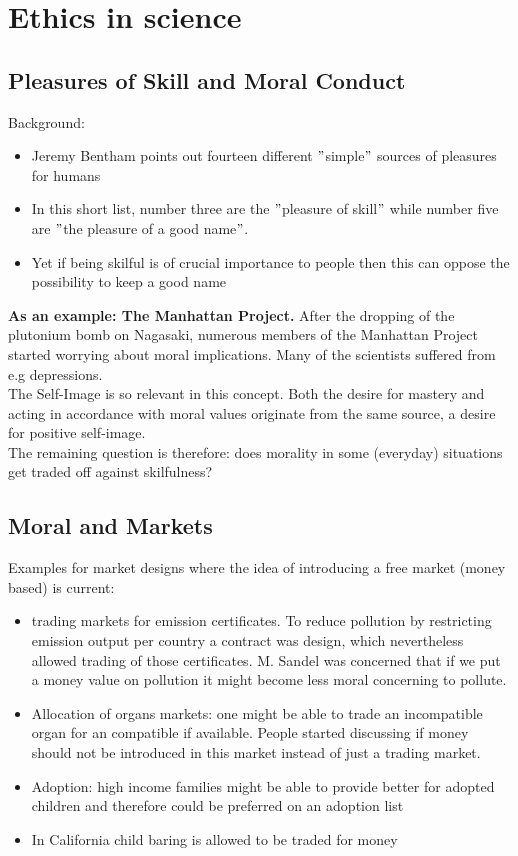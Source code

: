 

\chapter{Ethics in science}

\section{Pleasures of Skill and Moral Conduct}

Background:
\begin{itemize}
	\item Jeremy Bentham points out fourteen different $"$simple$"$ sources of pleasures for humans
	\item In this short list, number three are the $"$pleasure of skill$"$ while number five are $"$the pleasure of a good name$"$.
	\item Yet if being skilful is of crucial importance to people then this can oppose the possibility to keep a good name
\end{itemize}
  
  
  
\textbf{As an example: The Manhattan Project.} After the dropping of the plutonium bomb on Nagasaki, numerous members of the Manhattan Project started worrying about moral implications. Many of the scientists suffered from e.g depressions. \\ 

The Self-Image is so relevant in this concept. Both the desire for mastery and acting in accordance with moral values originate from the same source, a desire for positive self-image. \\ 

The remaining question is therefore: does morality in some (everyday) situations get traded off against skilfulness?


\section{Moral and Markets}

Examples for market designs where the idea of introducing a free market (money based) is current:
\begin{itemize}
	\item trading markets for emission certificates. To reduce pollution by restricting emission output per country a contract was design, which nevertheless allowed trading of those certificates. M. Sandel was concerned that if we put a money value on pollution it might become less moral concerning to pollute.
	\item Allocation of organs markets: one might be able to trade an incompatible organ for an compatible if available. People started discussing if money should not be introduced in this market instead of just a trading market.
	\item Adoption: high income families might be able to provide better for adopted children and therefore could be preferred on an adoption list
	\item In California child baring is allowed to be traded for money 
\end{itemize}

